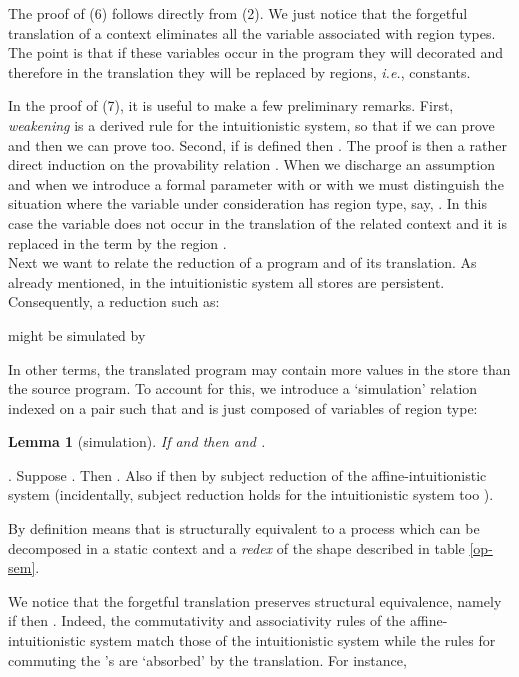 \documentclass[11pt]{article}
\newtheorem{lemma}[theorem]{Lemma}
\newcommand{\Proof}{\noindent {\sc Proof}. }
\newcommand{\qed}{\hfill}
\begin{document}
The proof of (6) follows directly from (2). We just
notice that the forgetful translation of a context  
eliminates all the variable associated with  region types.
The point is that if these variables occur in the program
they will decorated and therefore in the translation they will be replaced
by regions, {\em i.e.}, constants.

In the proof of (7), it is useful to make a few preliminary remarks.
First, {\em weakening} is a derived rule for the intuitionistic system,
so that if we can prove  and 
 then we can
prove  too.
Second, if  is defined then 
.
The proof is then a rather direct induction on the provability
relation . 
When we discharge an assumption and when we introduce a formal
parameter with  or with  we must distinguish
the situation where the variable under consideration has region
type, say, . In this case the variable does not occur in the
translation of the related context  and
it is replaced in the term by the region .
\qed \\

Next we want to relate the reduction of a program and of its
translation. As already mentioned, in the intuitionistic system all stores are persistent.
Consequently, a reduction such as:

might be simulated by 

In other terms, the translated program may contain more values in
the store than the source program. 
To account for this, we introduce a `simulation' relation  indexed on  a pair
 such that  and  is just composed of
variables of region type:


\begin{lemma}[simulation]\label{simulation-lemma}
If  and  then
 and .
\end{lemma}
\Proof
Suppose .
Then .
Also if  then  by 
subject reduction of the affine-intuitionistic system
(incidentally, subject reduction holds for the intuitionistic 
system too \cite{Amadio09}).

By definition  means that  is structurally
equivalent to a process  which can be decomposed 
in a static context  and a {\em redex}  of the
shape described in table \ref{op-sem}.

We notice that the forgetful translation preserves structural equivalence,
namely if  then .
Indeed, the commutativity and associativity rules of the affine-intuitionistic
system match those of the intuitionistic system while the rules for commuting
the 's are `absorbed' by the translation. For instance,
\end{document}
